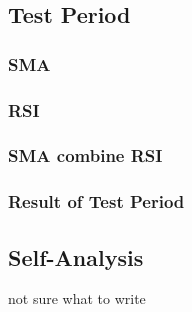 \documentclass[../main.tex]{subfiles}
\begin{document}
\subsection{Test Period}


\subsubsection{SMA}


\subsubsection{RSI}


\subsubsection{SMA combine RSI}


\subsubsection{Result of Test Period}


\subsection{Self-Analysis}
not sure what to write
\end{document}
